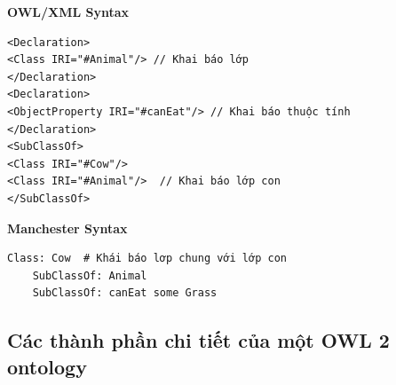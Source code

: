 \textbf{OWL/XML Syntax}
\begin{verbatim}
<Declaration>
<Class IRI="#Animal"/> // Khai báo lớp
</Declaration>
<Declaration>
<ObjectProperty IRI="#canEat"/> // Khai báo thuộc tính
</Declaration>
<SubClassOf>
<Class IRI="#Cow"/>
<Class IRI="#Animal"/>  // Khai báo lớp con
</SubClassOf>
\end{verbatim}

\textbf{Manchester Syntax}
\begin{verbatim}
Class: Cow  # Khái báo lơp chung với lớp con
	SubClassOf: Animal 
	SubClassOf: canEat some Grass
\end{verbatim}


\subsection{Các thành phần chi tiết của một OWL 2 ontology}

